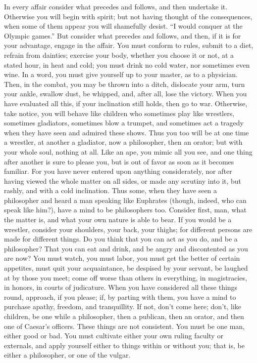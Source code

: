 In  every  affair  consider  what  precedes and  follows,  and  then  undertake
it.  Otherwise you  will  begin with  spirit;  but not  having  thought of  the
consequences, when  some of them appear  you will shamefully desist.  ``I would
conquer at  the Olympic games.''  But consider  what precedes and  follows, and
then, if it  is for your advantage,  engage in the affair. You  must conform to
rules, submit to a diet, refrain from dainties; exercise your body, whether you
choose it or  not, at a stated hour,  in heat and cold; you must  drink no cold
water, nor sometimes  even wine. In a  word, you must give yourself  up to your
master, as to a physician. Then, in the combat, you may be thrown into a ditch,
dislocate your arm, turn your ankle,  swallow dust, be whipped, and, after all,
lose the victory.  When you have evaluated all this,  if your inclination still
holds, then  go to war. Otherwise,  take notice, you will  behave like children
who  sometimes play  like  wrestlers, sometimes  gladiators,  sometimes blow  a
trumpet, and  sometimes act  a tragedy  when they have  seen and  admired these
shows. Thus you too will be at one time a wrestler, at another a gladiator, now
a philosopher, then an  orator; but with your whole soul,  nothing at all. Like
an ape, you  mimic all you see, and  one thing after another is  sure to please
you, but  is out of favor  as soon as it  becomes familiar. For you  have never
entered upon anything  considerately, nor after having viewed  the whole matter
on  all sides,  or made  any scrutiny  into  it, but  rashly, and  with a  cold
inclination.  Thus some,  when they  have seen  a philosopher  and heard  a man
speaking like Euphrates (though, indeed, who  can speak like him?), have a mind
to be philosophers too. Consider first, man,  what the matter is, and what your
own  nature  is able  to  bear.  If you  would  be  a wrestler,  consider  your
shoulders, your back, your thighs; for different persons are made for different
things. Do you think that you can act as you do, and be a philosopher? That you
can eat  and drink,  and be  angry and discontented  as you  are now?  You must
watch, you must labor, you must get  the better of certain appetites, must quit
your acquaintance,  be despised  by your  servant, be laughed  at by  those you
meet; come off worse than others  in everything, in magistracies, in honors, in
courts  of  judicature.  When  you  have considered  all  these  things  round,
approach, if you please; if, by parting  with them, you have a mind to purchase
apathy,  freedom,  and tranquillity.  If  not,  don't  come here;  don't,  like
children, be one while a philosopher, then a publican, then an orator, and then
one of Caesar's officers. These things are not consistent. You must be one man,
either  good or  bad. You  must  cultivate either  your own  ruling faculty  or
externals, and apply yourself either to  things within or without you; that is,
be either a philosopher, or one of the vulgar.
